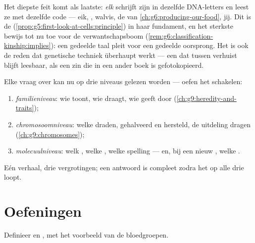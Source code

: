 \begin{remark}\label{rem:g9:genes-and-dna:universal}
Het diepste feit komt als laatste: \emph{elk} 
schrijft zijn  in dezelfde DNA-letters en leest ze met
dezelfde code --- eik, , walvis, de  van
\cref{ch:g6:producing-our-food}, jij. Dit is de  (\cref{prop:g5:first-look-at-cells:principle}) in haar
fundament, en het sterkste bewijs tot nu toe voor de
verwantschapsboom
(\cref{rem:g6:classification-kinship:implies}): een gedeelde taal
pleit voor een gedeelde oorsprong. Het is ook de reden dat
genetische techniek überhaupt werkt --- een  dat tussen
 verhuist blijft leesbaar, als een zin die in een ander
boek is gefotokopieerd.
\end{remark}

\begin{method}\label{met:g9:genes-and-dna:levels}
Elke vraag over  kan nu op drie niveaus gelezen
worden --- oefen het schakelen:
\begin{enumerate}
  \item \emph{familieniveau}: wie toont, wie draagt, wie geeft
        door (\cref{ch:g9:heredity-and-traits});
  \item \emph{chromosoomniveau}: welke draden, gehalveerd en
        hersteld, de uitdeling dragen
        (\cref{ch:g9:chromosomes});
  \item \emph{molecuulniveau}: welk , welke , welke
        spelling --- en, bij een nieuw , welke .
\end{enumerate}
Eén verhaal, drie vergrotingen; een antwoord is compleet zodra
het op alle drie loopt.
\end{method}

\section{Oefeningen}

\begin{exercise}[$\star$]\label{exo:g9:genes-and-dna:1}
Definieer  en , met het voorbeeld van de bloedgroepen.
\end{exercise}

